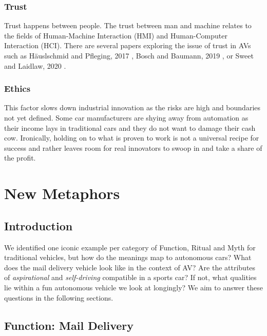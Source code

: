 \documentclass[12pt, usenames, dvipsnames]{report}
\begin{document}
\begin{flushleft}
\subsection{Trust}
\label{sec:trust}

Trust happens between people. 
The trust between man and machine relates to the fields of Human-Machine Interaction (HMI) and Human-Computer Interaction (HCI).
There are several papers exploring the issue of trust in AVs such as Häuslschmid and Pfleging, 2017 \cite{haeuslschmid2017}, Bosch and Baumann, 2019 \cite{bosch2019}, or Sweet and Laidlaw, 2020 \cite{sweet2020}.

\subsection{Ethics}

This factor slows down industrial innovation as the risks are high and boundaries not yet defined.
Some car manufacturers are shying away from automation as their income lays in traditional cars and they do not want to damage their cash cow.
Ironically, holding on to what is proven to work is not a universal recipe for success and rather leaves room for real innovators to swoop in and take a share of the profit.


\chapter{New Metaphors}
\label{sec:newmetaphors}

\section*{Introduction}

We identified one iconic example per category of Function, Ritual and Myth for traditional vehicles, but how do the meanings map to autonomous cars?
What does the mail delivery vehicle look like in the context of AV? 
Are the attributes of \emph{aspirational} and \emph{self-driving} compatible in a sports car?
If not, what qualities lie within a fun autonomous vehicle we look at longingly?
We aim to answer these questions in the following sections.


\section{Function: Mail Delivery}


\end{flushleft}
\end{document}
